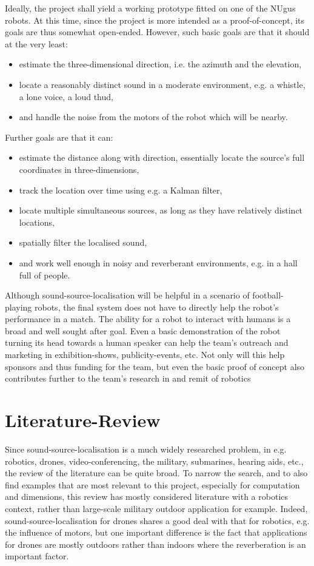 \documentclass[notitlepage]{report}
\begin{document}
Ideally, the project shall yield a working prototype fitted on one of the NUgus robots. At this time, since the project is more intended as a proof-of-concept, its goals are thus somewhat open-ended. However, such basic goals are that it should at the very least:
\begin{itemize}
	\item estimate the three-dimensional direction, i.e. the azimuth and the elevation,
	\item locate a reasonably distinct sound in a moderate environment, e.g. a whistle, a lone voice, a loud thud,
	\item and handle the noise from the motors of the robot which will be nearby.
\end{itemize}
Further goals are that it can:
\begin{itemize}
	\item estimate the distance along with direction, essentially locate the source's full coordinates in three-dimensions,
	\item track the location over time using e.g. a Kalman filter,
	\item locate multiple simultaneous sources, as long as they have relatively distinct locations,
	\item spatially filter the localised sound,
	\item and work well enough in noisy and reverberant environments, e.g. in a hall full of people.
\end{itemize}


Although sound-source-localisation will be helpful in a scenario of football-playing robots, the final system does not have to directly help the robot's performance in a match. The ability for a robot to interact with humans is a broad and well sought after goal. Even a basic demonstration of the robot turning its head towards a human speaker can help the team's outreach and marketing in exhibition-shows, publicity-events, etc. Not only will this help sponsors and thus funding for the team, but even the basic proof of concept also contributes further to the team's research in and remit of robotics 

\chapter{Literature-Review}

Since sound-source-localisation is a much widely researched problem, in e.g. robotics, drones, video-conferencing, the military, submarines, hearing aids, etc., the review of the literature can be quite broad. To narrow the search, and to also find examples that are most relevant to this project, especially for computation and dimensions, this review has mostly considered literature with a robotics context, rather than large-scale military outdoor application for example. Indeed, sound-source-localisation for drones shares a good deal with that for robotics, e.g. the influence of motors, but one important difference is the fact that applications for drones are mostly outdoors rather than indoors where the reverberation is an important factor.
\end{document}
